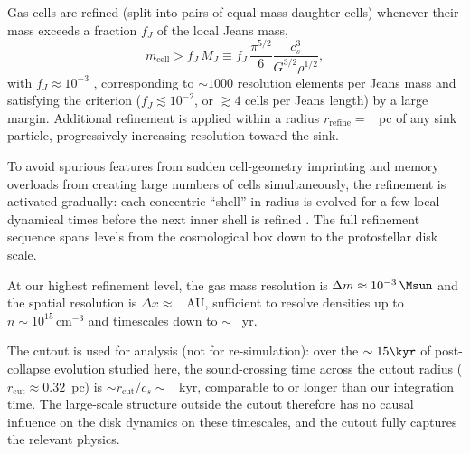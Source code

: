Gas cells are refined (split into pairs of equal-mass daughter
cells) whenever their mass exceeds a fraction $f_J$ of the
local Jeans mass,
\begin{equation}
    m_\mathrm{cell} > f_J \, M_J \equiv f_J\,\frac{\pi^{5/2}}{6}
    \frac{c_s^3}{G^{3/2}\rho^{1/2}},
\end{equation}
with $f_J \approx 10^{-3}$ \note{[VERIFY]}, corresponding to
$\sim 1000$ resolution elements per Jeans mass and satisfying the
\citet{truelove97} criterion ($f_J \lesssim 10^{-2}$, or $\gtrsim
4$ cells per Jeans length) by a large margin.
Additional refinement is applied within a radius
$r_\mathrm{refine} = $ ~pc of any sink particle,
progressively increasing resolution toward the sink.

To avoid spurious features from sudden cell-geometry imprinting
and memory overloads from creating large numbers of cells
simultaneously, the refinement is activated gradually: each
concentric ``shell'' in radius is evolved for a few local
dynamical times before the next inner shell is refined
\citep{FORGE_d_in_FIRE_Hopkin_2023}.
The full refinement sequence spans  levels from the
cosmological box down to the protostellar disk scale.

At our highest refinement level, the gas mass resolution is
$\Delta m \approx 10^{-3}\,\Msun$ and the spatial resolution
is $\Delta x \approx $ ~AU, sufficient to resolve
densities up to $n \sim 10^{15}\,\mathrm{cm}^{-3}$ and
timescales down to $\sim $ ~yr.



The cutout is used for analysis (not for re-simulation): over
the $\sim 15\kyr$ of post-collapse evolution studied here,
the sound-crossing time across the cutout radius
($r_\mathrm{cut} \approx 0.32$~pc) is
$\sim r_\mathrm{cut}/c_s \sim $ ~kyr, comparable
to or longer than our integration time.
The large-scale structure outside the cutout therefore has no
causal influence on the disk dynamics on these timescales, and
the cutout fully captures the relevant physics.


